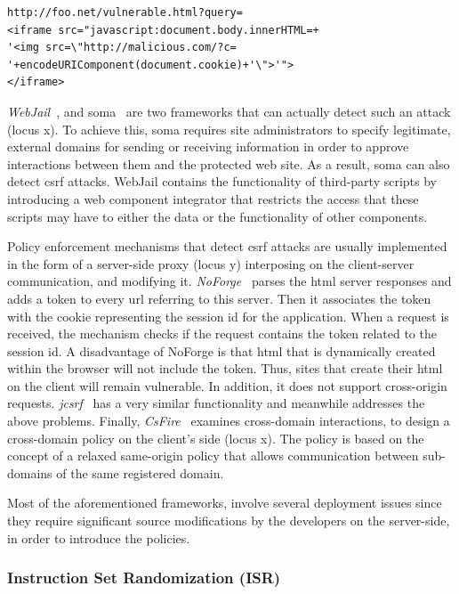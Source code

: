 \documentclass[conference]{IEEEtran}
\begin{document}
\lstset{language=VBScript, basicstyle=\footnotesize\ttfamily,}
\begin{lstlisting}
http://foo.net/vulnerable.html?query=
<iframe src="javascript:document.body.innerHTML=+
'<img src=\"http://malicious.com/?c=
'+encodeURIComponent(document.cookie)+'\">'">
</iframe>
\end{lstlisting}

\noindent
{\it WebJail}~\cite{VDDPJ11}, and
{\sc soma}~\cite{OWVS08} are two frameworks that
can actually detect such an attack (locus {\sc x}).
To achieve this, {\sc soma} requires site administrators
to specify legitimate, external domains for sending
or receiving information in order to approve interactions
between them and the protected web site. As a result,
{\sc soma} can also detect {\sc csrf} attacks.
WebJail contains the functionality of third-party scripts
by introducing a web component integrator that restricts
the access that these scripts may have to either the data
or the functionality of other components.

Policy enforcement mechanisms that detect {\sc csrf}
attacks are usually implemented in the form of a
server-side proxy (locus {\sc y})
interposing on the client-server communication, and modifying
it. {\it NoForge}~\cite{JKK06a}
parses the {\sc html} server responses
and adds a token to every {\sc url} referring to this
server. Then it associates the token with the cookie
representing the session {\sc id} for the application.
When a request is received, the mechanism checks
if the request contains the token related
to the session {\sc id}. A disadvantage of NoForge
is that {\sc html} that is dynamically created within
the browser will not include the token.
Thus, sites that create their {\sc html} on the client
will remain vulnerable. In addition, it does not
support cross-origin requests.
{\it j{\sc csrf}}~\cite{PS11}
has a very similar functionality and meanwhile
addresses the above problems.
Finally, {\it CsFire}~\cite{DDHPJ10}
examines cross-domain interactions, to design a
cross-domain policy on the client's side (locus {\sc x}).
The policy is based on the concept of a relaxed
same-origin policy that allows communication between
sub-domains of the same registered domain.

Most of the aforementioned frameworks, involve
several deployment issues since they
require significant source modifications by the
developers on the server-side, in order to
introduce the policies.

\subsubsection{Instruction Set Randomization (ISR)}
\end{document}
